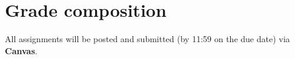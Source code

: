 \documentclass[11pt]{article}
\begin{document}

\section*{Grade composition}

All assignments will be posted and submitted (by 11:59 on the due date) via \textbf{Canvas}. \\
\end{document}
